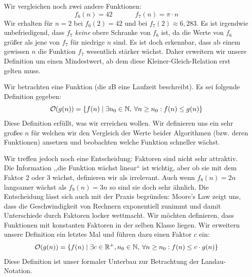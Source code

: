 Wir vergleichen noch zwei andere Funktionen:
\[
   f_6(n) = 42   \hspace{40pt}  f_7(n) = \pi \cdot n
\]
Wir erhalten für $n = 2$ bei $f_6(2) = 42$ und bei $f_7(2) \approx 6,283$. Es ist irgendwie unbefriedigend, dass $f_7$ \emph{keine} obere Schranke von $f_6$ ist, da die Werte von $f_6$ größer als jene von $f_7$ für niedrige $n$ sind. Es ist doch erkennbar, dass ab einem gewissen $n$ die Funktion $f_7$ wesentlich stärker wächst. Daher erweitern wir unsere Definition um einen Mindestwert, ab dem diese Kleiner-Gleich-Relation erst gelten muss.

Wir betrachten eine Funktion (die zB eine Laufzeit beschreibt). Es sei folgende Definition gegeben:
\[
  \mathcal{O}\!\left(g(n)\right) = \{ f(n) \mid \exists n_0 \in \mathbb{N}, \:\forall n \geq n_0: f(n) \leq g(n) \}
\]
Diese Definition erfüllt, was wir erreichen wollen. Wir definieren uns ein sehr großes $n$ für welchen wir den Vergleich der Werte beider Algorithmen (bzw. deren Funktionen) ansetzen und beobachten welche Funktion schneller wächst.

Wir treffen jedoch noch eine Entscheidung: Faktoren sind nicht sehr attraktiv. Die Information ,,die Funktion wächst linear`` ist wichtig, aber ob sie mit dem Faktor $2$ oder $3$ wächst, definieren wir als irrelevant. Auch wenn $f_8(n) = 2n$ langsamer wächst als $f_9(n) = 3n$ so sind sie doch sehr ähnlich. Die Entscheidung lässt sich auch mit der Praxis begründen: Moore's Law zeigt uns, dass die Geschwindigkeit von Rechnern exponentiell zunimmt und damit Unterschiede durch Faktoren locker wettmacht. Wir möchten definieren, dass Funktionen mit konstanten Faktoren in der selben Klasse liegen. Wir erweitern unsere Definition ein letztes Mal und führen dazu einen Faktor $c$ ein:
\[
   \mathcal{O}\!\left(g(n)\right) = \{ f(n) \mid \exists c \in \mathbb{R}^+, n_0 \in \mathbb{N},
                  \:\forall n \geq n_0: f(n) \leq c \cdot g(n) \}
\]
%
Diese Definition ist unser formaler Unterbau zur Betrachtung der Landau-Notation.

